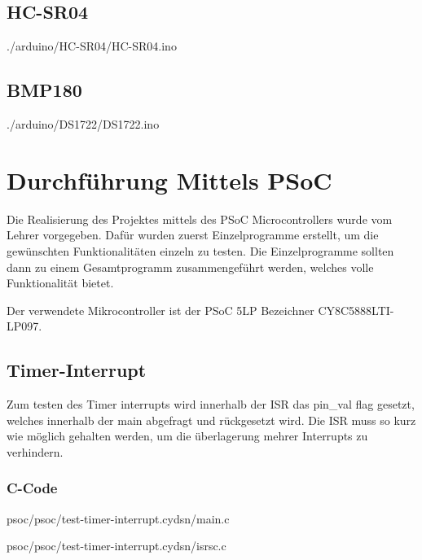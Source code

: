 \documentclass[12pt,a4paper,german]{article}
\begin{document}
\newpage
\subsection{HC-SR04}


 {./arduino/HC-SR04/HC-SR04.ino}

\newpage
\subsection{BMP180}


 {./arduino/DS1722/DS1722.ino}

\newpage
\section{Durchführung Mittels PSoC}

	Die Realisierung des Projektes mittels des PSoC Microcontrollers wurde
	vom Lehrer vorgegeben. Dafür wurden zuerst Einzelprogramme erstellt,
	um die gewünschten Funktionalitäten einzeln zu testen. Die
	Einzelprogramme sollten dann zu einem Gesamtprogramm zusammengeführt
	werden, welches volle Funktionalität bietet.

	Der verwendete Mikrocontroller ist der PSoC 5LP Bezeichner 
	CY8C5888LTI-LP097.

\subsection{Timer-Interrupt}

Zum testen des Timer interrupts wird innerhalb der ISR das pin\_val flag gesetzt,
welches innerhalb der main abgefragt und rückgesetzt wird. Die ISR muss so kurz
wie möglich gehalten werden, um die überlagerung mehrer Interrupts zu
verhindern.

\subsubsection{C-Code}


	{psoc/psoc/test-timer-interrupt.cydsn/main.c}

	{psoc/psoc/test-timer-interrupt.cydsn/isrsc.c}
\end{document}
